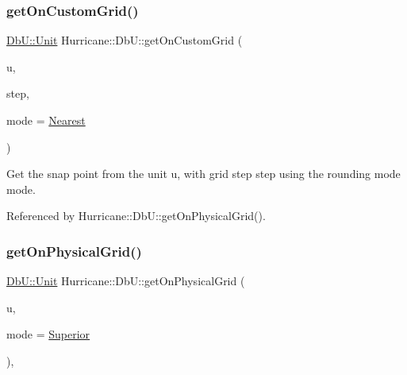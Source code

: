 \subsubsection{\texorpdfstring{get\+On\+Custom\+Grid()}{getOnCustomGrid()}}
{\footnotesize\ttfamily \hyperlink{group__DbUGroup_ga4fbfa3e8c89347af76c9628ea06c4146}{Db\+U\+::\+Unit} Hurricane\+::\+Db\+U\+::get\+On\+Custom\+Grid (\begin{DoxyParamCaption}\item[{\hyperlink{group__DbUGroup_ga4fbfa3e8c89347af76c9628ea06c4146}{Db\+U\+::\+Unit}}]{u,  }\item[{\hyperlink{group__DbUGroup_ga4fbfa3e8c89347af76c9628ea06c4146}{Db\+U\+::\+Unit}}]{step,  }\item[{\hyperlink{group__DbUGroup_ga1082168d6f9956ebba22ab8bbec21637}{Db\+U\+::\+Snap\+Mode}}]{mode = {\ttfamily \hyperlink{group__DbUGroup_gga1082168d6f9956ebba22ab8bbec21637a65e6f47eb16779b8974a80d6145a2db5}{Nearest}} }\end{DoxyParamCaption})\hspace{0.3cm}{\ttfamily [static]}}

Get the snap point from the unit {\ttfamily u}, with grid step {\ttfamily step} using the rounding mode {\ttfamily mode}. 

Referenced by Hurricane\+::\+Db\+U\+::get\+On\+Physical\+Grid().

\mbox{\label{group__DbUGroup_ga9419025221579f4277475c65655be3dc}} 
\subsubsection{\texorpdfstring{get\+On\+Physical\+Grid()}{getOnPhysicalGrid()}}
{\footnotesize\ttfamily \hyperlink{group__DbUGroup_ga4fbfa3e8c89347af76c9628ea06c4146}{Db\+U\+::\+Unit} Hurricane\+::\+Db\+U\+::get\+On\+Physical\+Grid (\begin{DoxyParamCaption}\item[{\hyperlink{group__DbUGroup_ga4fbfa3e8c89347af76c9628ea06c4146}{Db\+U\+::\+Unit}}]{u,  }\item[{\hyperlink{group__DbUGroup_ga1082168d6f9956ebba22ab8bbec21637}{Db\+U\+::\+Snap\+Mode}}]{mode = {\ttfamily \hyperlink{group__DbUGroup_gga1082168d6f9956ebba22ab8bbec21637a8ce92cf7ff7627c46baf85612f9ad847}{Superior}} }\end{DoxyParamCaption})\hspace{0.3cm}{\ttfamily [inline]}, {\ttfamily [static]}}

